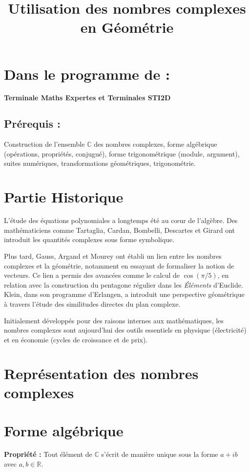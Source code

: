 \documentclass[a4paper,12pt]{article}
\title{Utilisation des nombres complexes en Géométrie}
\begin{document}
    \maketitle

    \section*{Dans le programme de :}
    \textbf{Terminale Maths Expertes et Terminales STI2D}

    \subsection*{Prérequis :}
    Construction de l’ensemble $\mathbb{C}$ des nombres complexes, forme algébrique (opérations, propriétés, conjugué), forme trigonométrique (module, argument), suites numériques, transformations géométriques, trigonométrie.

\section*{Partie Historique}

L'étude des équations polynomiales a longtemps été au cœur de l'algèbre. Des mathématiciens comme Tartaglia, Cardan, Bombelli, Descartes et Girard ont introduit les quantités complexes sous forme symbolique.

Plus tard, Gauss, Argand et Mourey ont établi un lien entre les nombres complexes et la géométrie, notamment en essayant de formaliser la notion de vecteurs. Ce lien a permis des avancées comme le calcul de $\cos(\pi/5)$, en relation avec la construction du pentagone régulier dans les \emph{Éléments} d'Euclide. Klein, dans son programme d'Erlangen, a introduit une perspective géométrique à travers l'étude des similitudes directes du plan complexe.

Initialement développés pour des raisons internes aux mathématiques, les nombres complexes sont aujourd'hui des outils essentiels en physique (électricité) et en économie (cycles de croissance et de prix).



    \section*{Représentation des nombres complexes}
    \section{Forme algébrique}
    \textbf{Propriété :} Tout élément de $\mathbb{C}$ s’écrit de manière unique sous la forme $a + ib$ avec $a, b \in \mathbb{R}$.
\end{document}
